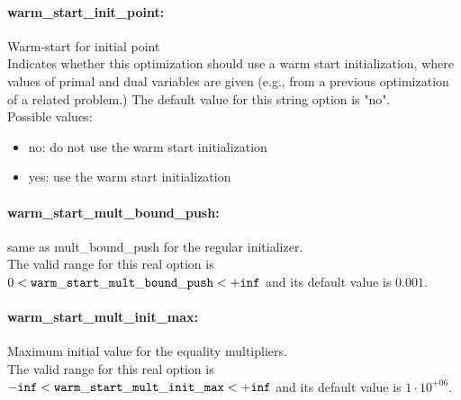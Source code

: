 \paragraph{warm\_start\_init\_point:}\label{sec:warm_start_init_point} Warm-start for initial point $\;$ \\
 Indicates whether this optimization should use a
warm start initialization, where values of primal
and dual variables are given (e.g., from a
previous optimization of a related problem.)
The default value for this string option is "no".
\\ 
Possible values:
\begin{itemize}
   \item no: do not use the warm start initialization
   \item yes: use the warm start initialization
\end{itemize}

\paragraph{warm\_start\_mult\_bound\_push:}\label{sec:warm_start_mult_bound_push} same as mult\_bound\_push for the regular initializer. $\;$ \\
 The valid range for this real option is 
$0 <  {\tt warm\_start\_mult\_bound\_push } <  {\tt +inf}$
and its default value is $0.001$.


\paragraph{warm\_start\_mult\_init\_max:}\label{sec:warm_start_mult_init_max} Maximum initial value for the equality multipliers. $\;$ \\
 The valid range for this real option is 
${\tt -inf} <  {\tt warm\_start\_mult\_init\_max } <  {\tt +inf}$
and its default value is $1 \cdot 10^{+06}$.




